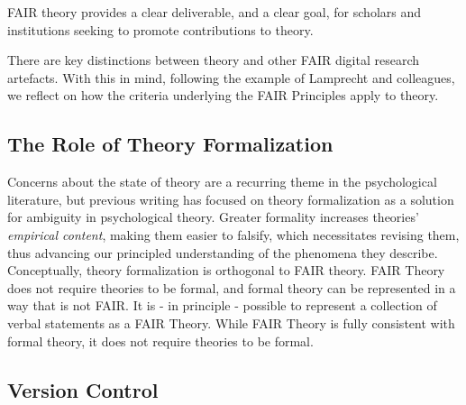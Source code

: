 \documentclass[
  man]{apa6}
\begin{document}
FAIR theory provides a clear deliverable, and a clear goal, for scholars and institutions seeking to promote contributions to theory.

There are key distinctions between theory and other FAIR digital research artefacts. With this in mind, following the example of Lamprecht and colleagues, we reflect on how the criteria underlying the FAIR Principles apply to theory.

\subsection{The Role of Theory Formalization}\label{the-role-of-theory-formalization}

Concerns about the state of theory are a recurring theme in the psychological literature,
but previous writing has focused on theory formalization as a solution for ambiguity in psychological theory.
Greater formality increases theories' \emph{empirical content},
making them easier to falsify,
which necessitates revising them,
thus advancing our principled understanding of the phenomena they describe.
Conceptually, theory formalization is orthogonal to FAIR theory.
FAIR Theory does not require theories to be formal, and formal theory can be represented in a way that is not FAIR.
It is - in principle - possible to represent a collection of verbal statements as a FAIR Theory.
While FAIR Theory is fully consistent with formal theory, it does not require theories to be formal.

\subsection{Version Control}\label{version-control}
\end{document}
